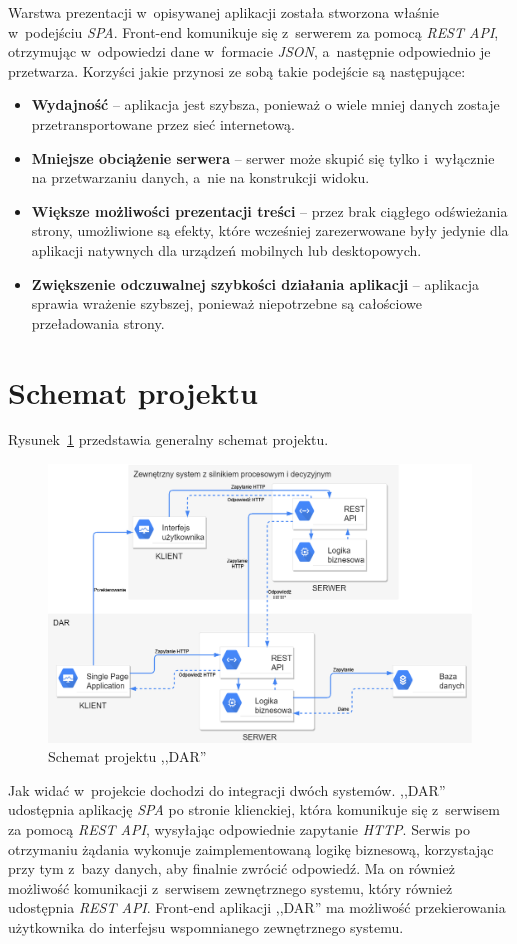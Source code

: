 Warstwa prezentacji w~opisywanej aplikacji została stworzona właśnie w~podejściu \emph{SPA}. Front-end komunikuje się z~serwerem za pomocą \emph{REST API}, otrzymując w~odpowiedzi dane w~formacie \emph{JSON}, a~następnie odpowiednio je przetwarza. Korzyści jakie przynosi ze sobą takie podejście są następujące:
\begin{itemize}
    \item \textbf{Wydajność} -- aplikacja jest szybsza, ponieważ o wiele mniej danych zostaje przetransportowane przez sieć internetową.
    \item \textbf{Mniejsze obciążenie serwera} -- serwer może skupić się tylko i~wyłącznie na przetwarzaniu danych, a~nie na konstrukcji widoku.
    \item \textbf{Większe możliwości prezentacji treści} -- przez brak ciągłego odświeżania strony, umożliwione są efekty, które wcześniej zarezerwowane były jedynie dla aplikacji natywnych dla urządzeń mobilnych lub desktopowych.
    \item \textbf{Zwiększenie odczuwalnej szybkości działania aplikacji} --  aplikacja sprawia wrażenie szybszej, ponieważ niepotrzebne są całościowe przeładowania strony.
\end{itemize}

\section{Schemat projektu}
\label{sec:schematAplikacji}
Rysunek~\ref{fig:projectScheme} przedstawia generalny schemat projektu.
\begin{figure}
    \centering
    \includegraphics[width=\textwidth]{./assets/projectScheme.png}
    \caption{Schemat projektu ,,DAR''}
    \label{fig:projectScheme}
\end{figure}
Jak widać w~projekcie dochodzi do integracji dwóch systemów. ,,DAR'' udostępnia aplikację \emph{SPA} po stronie klienckiej, która komunikuje się z~serwisem za pomocą \emph{REST API}, wysyłając odpowiednie zapytanie \emph{HTTP}. Serwis po otrzymaniu żądania wykonuje zaimplementowaną logikę biznesową, korzystając przy tym z~bazy danych, aby finalnie zwrócić odpowiedź. Ma on również możliwość komunikacji z~serwisem zewnętrznego systemu, który również udostępnia \emph{REST API}. Front-end aplikacji ,,DAR'' ma możliwość przekierowania użytkownika do interfejsu wspomnianego zewnętrznego systemu. 

